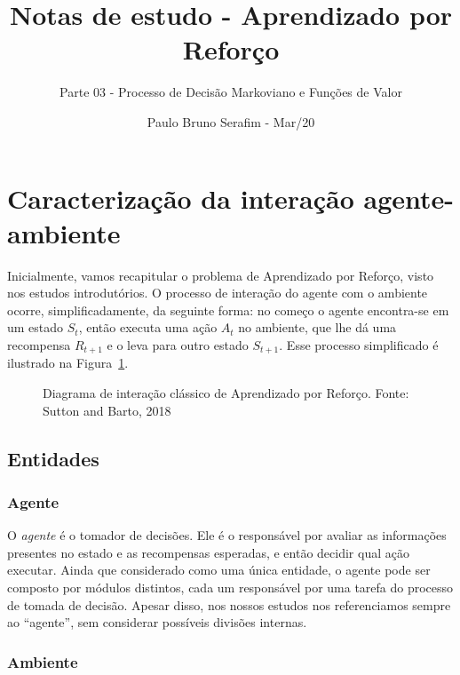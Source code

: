 \documentclass{article}
\title{Notas de estudo - Aprendizado por Reforço}
\author{Parte 03 - Processo de Decisão Markoviano e Funções de Valor}
\date{Paulo Bruno Serafim - Mar/20}
\begin{document}
\maketitle

    \section{Caracterização da interação agente-ambiente}
    
        Inicialmente, vamos recapitular o problema de Aprendizado por Reforço, visto nos estudos introdutórios. O processo de interação do agente com o ambiente ocorre, simplificadamente, da seguinte forma: no começo o agente encontra-se em um estado $S_t$, então executa uma ação $A_t$ no ambiente, que lhe dá uma recompensa $R_{t+1}$ e o leva para outro estado $S_{t+1}$. Esse processo simplificado é ilustrado na Figura~\ref{diag:classical-rl}.
                
        \begin{figure}[ht]
            \centering
            \vspace*{5mm}
            \rlinteraction
            \vspace*{-5mm}
            \caption{Diagrama de interação clássico de Aprendizado por Reforço. Fonte: Sutton and Barto, 2018}
            \label{diag:classical-rl}
        \end{figure}
        
        \subsection{Entidades}
            
            \subsubsection{Agente}
            
                O \emph{agente} é o tomador de decisões. Ele é o responsável por avaliar as informações presentes no estado e as recompensas esperadas, e então decidir qual ação executar. Ainda que considerado como uma única entidade, o agente pode ser composto por módulos distintos, cada um responsável por uma tarefa do processo de tomada de decisão. Apesar disso, nos nossos estudos nos referenciamos sempre ao ``agente'', sem considerar possíveis divisões internas.
            
            \subsubsection{Ambiente}
            
\end{document}
